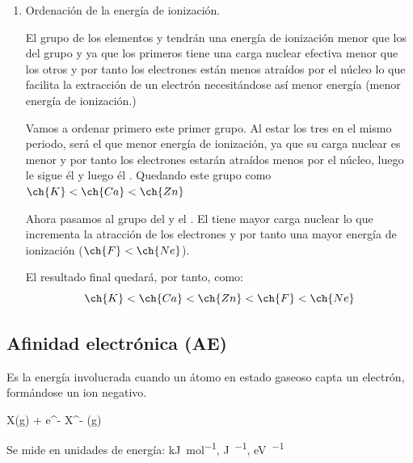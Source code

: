 \begin{example}
\begin{enumerate}[label=\letraminuscula]
            Finalmente, la ordenación por radio atómico quedará de la siguiente manera:
            \[
                \ch{Ne} < \ch{F} < \ch{Zn} < \ch{Ca} < \ch{K}
            \]
            \
            \item Ordenación de la energía de ionización.

            El grupo de los elementos   y  tendrán una energía de ionización menor que los del grupo  y  ya que los primeros tiene una carga nuclear efectiva menor que los otros y por tanto los electrones están menos atraídos por el núcleo lo que facilita la extracción de un electrón necesitándose así menor energía (menor energía de ionización.)

            Vamos a ordenar primero este primer grupo.
            Al estar los tres en el mismo periodo,  será el que menor energía de ionización, ya que su carga nuclear es menor y por tanto los electrones estarán atraídos menos por el núcleo, luego le sigue él  y luego él .
            Quedando este grupo como \( \ch{K} < \ch{Ca} < \ch{Zn}  \)

            Ahora pasamos al grupo del  y el .
            El \ch{Ne} tiene mayor carga nuclear lo que incrementa la atracción de los electrones y por tanto una mayor energía de ionización (\( \ch{F} < \ch{Ne}  \)).

            El resultado final quedará, por tanto, como:
            \begin{equation*}
                \ch{K} < \ch{Ca} < \ch{Zn} < \ch{F} < \ch{Ne}
            \end{equation*}
    \end{enumerate}
\end{example}

\subsection{Afinidad electrónica (AE)}

\begin{definition}
        Es la energía involucrada cuando un átomo en estado gaseoso capta un electrón, formándose un ion negativo.
        \begin{centeredequation}
           X(g) + e^- \longrightarrow X^- (g)
        \end{centeredequation}
        Se mide en unidades de energía: \unit{\kilo\joule\per\mole}, \unit{\joule\per {}},  \unit{\electronvolt\per {}}
\end{definition}

